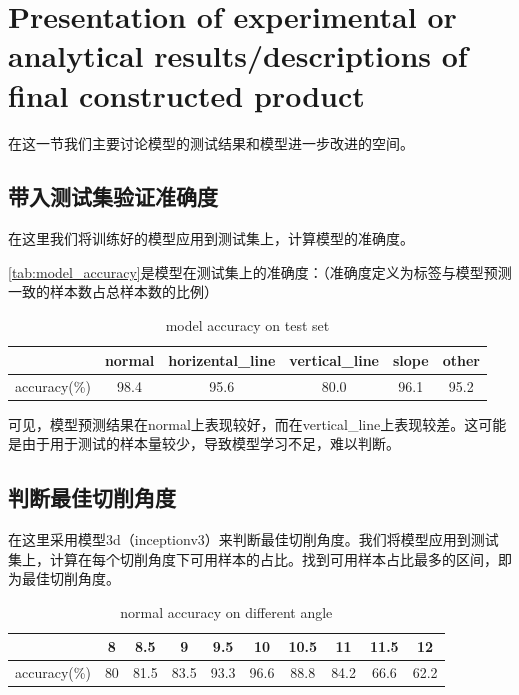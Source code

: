 \section{Presentation of experimental or analytical results/descriptions of final constructed product}
在这一节我们主要讨论模型的测试结果和模型进一步改进的空间。


\subsection{带入测试集验证准确度}

在这里我们将训练好的模型应用到测试集上，计算模型的准确度。

\autoref{tab:model_accuracy}是模型在测试集上的准确度：（准确度定义为标签与模型预测一致的样本数占总样本数的比例）

\begin{table}
\centering
\caption{model accuracy on test set}
\begin{tabular}{cccccc}
    \toprule
    & normal & horizental\_line & vertical\_line & slope & other \\
    \midrule
    accuracy(\%) & 98.4 & 95.6 & 80.0 & 96.1 & 95.2 \\
    \bottomrule
\end{tabular}
\label{tab:model_accuracy}
\end{table}

可见，模型预测结果在normal上表现较好，而在vertical\_line上表现较差。这可能是由于用于测试的样本量较少，导致模型学习不足，难以判断。


\subsection{判断最佳切削角度}

在这里采用模型3d（inceptionv3）来判断最佳切削角度。我们将模型应用到测试集上，计算在每个切削角度下可用样本的占比。找到可用样本占比最多的区间，即为最佳切削角度。

\begin{table}
    \centering
    \caption{normal accuracy on different angle}
    \begin{tabular}{cccccccccc}
        \toprule
        & 8 & 8.5 & 9 & 9.5 & 10 & 10.5 & 11 & 11.5 & 12 \\
        \midrule
        accuracy(\%) & 80 & 81.5 & 83.5 & 93.3 & 96.6 & 88.8 & 84.2 & 66.6 & 62.2 \\ 
        \bottomrule
    \end{tabular}
    \label{tab:model_accuracy_angle}
    \end{table}


